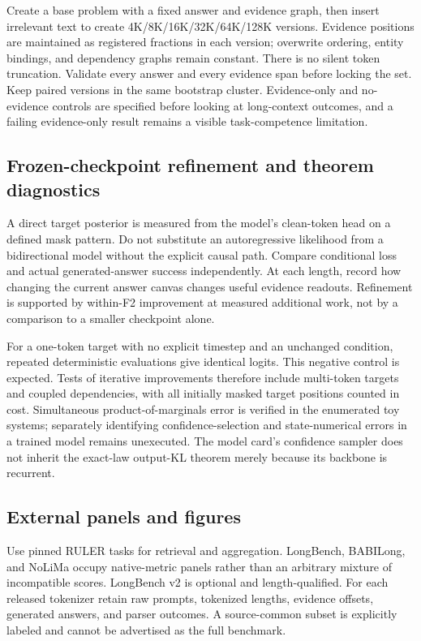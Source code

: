 \documentclass{article}
\theoremstyle{remark}\newtheorem{remark}[theorem]{Remark}
\begin{document}
Create a base problem with a fixed answer and evidence graph, then insert irrelevant text to create 4K/8K/16K/32K/64K/128K versions. Evidence positions are maintained as registered fractions in each version; overwrite ordering, entity bindings, and dependency graphs remain constant. There is no silent token truncation. Validate every answer and every evidence span before locking the set. Keep paired versions in the same bootstrap cluster. Evidence-only and no-evidence controls are specified before looking at long-context outcomes, and a failing evidence-only result remains a visible task-competence limitation.

\subsection{Frozen-checkpoint refinement and theorem diagnostics}
A direct target posterior is measured from the model's clean-token head on a defined mask pattern. Do not substitute an autoregressive likelihood from a bidirectional model without the explicit causal path. Compare conditional loss and actual generated-answer success independently. At each length, record how changing the current answer canvas changes useful evidence readouts. Refinement is supported by within-F2 improvement at measured additional work, not by a comparison to a smaller checkpoint alone.

For a one-token target with no explicit timestep and an unchanged condition, repeated deterministic evaluations give identical logits. This negative control is expected. Tests of iterative improvements therefore include multi-token targets and coupled dependencies, with all initially masked target positions counted in cost. Simultaneous product-of-marginals error is verified in the enumerated toy systems; separately identifying confidence-selection and state-numerical errors in a trained model remains unexecuted. The model card's confidence sampler does not inherit the exact-law output-KL theorem merely because its backbone is recurrent.

\subsection{External panels and figures}
Use pinned RULER tasks for retrieval and aggregation. LongBench, BABILong, and NoLiMa occupy native-metric panels rather than an arbitrary mixture of incompatible scores. LongBench v2 is optional and length-qualified. For each released tokenizer retain raw prompts, tokenized lengths, evidence offsets, generated answers, and parser outcomes. A source-common subset is explicitly labeled and cannot be advertised as the full benchmark.
\end{document}
